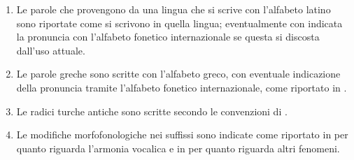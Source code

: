 \begin{enumerate}
\item  Le  parole che  provengono  da una  lingua  che  si scrive  con
  l'alfabeto latino sono riportate  come si scrivono in quella lingua;
  eventualmente  con  indicata la  pronuncia  con l'alfabeto  fonetico
  internazionale se questa si discosta dall'uso attuale.

\item  Le  parole  greche  sono  scritte  con  l'alfabeto  greco,  con
  eventuale  indicazione della  pronuncia tramite  l'alfabeto fonetico
  internazionale, come riportato in .

\item Le radici turche antiche  sono scritte secondo le convenzioni di
  .

\item Le  modifiche morfofonologiche  nei suffissi sono  indicate come
  riportato  in   per  quanto riguarda  l'armonia
  vocalica  e  in     per  quanto  riguarda  altri
  fenomeni.


\end{enumerate}
